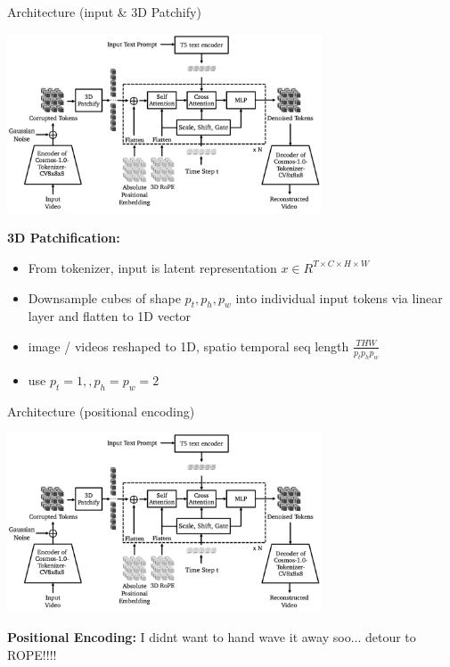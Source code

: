 \documentclass{beamer}
\begin{document}
\begin{frame}[t]{Architecture (input \& 3D Patchify)}
    \vspace{-1.6em}
    \begin{center}
        \includegraphics[width=0.7\textwidth]{./img/diffusion_arch.png}
    \end{center}
    \textbf{3D Patchification:}
    \begin{itemize}[label=-]
        \item From tokenizer, input is latent representation $x \in R^{T \times C \times H \times W}$ 
        \item Downsample cubes of shape $p_t, p_h, p_w$ into individual input tokens via linear layer and flatten to 1D vector
        \item image / videos reshaped to 1D, spatio temporal seq length $\frac{T H W}{p_t p_h p_w}$
        \item use $p_t = 1, ,p_h=p_w=2$
    \end{itemize}
\end{frame}

\begin{frame}[t]{Architecture (positional encoding)}
    \vspace{-1.6em}
    \begin{center}
        \includegraphics[width=0.7\textwidth]{./img/diffusion_arch.png}
    \end{center}
    \textbf{Positional Encoding:}
    \newline
    I didnt want to hand wave it away soo... detour to ROPE!!!!
\end{frame}
\end{document}
